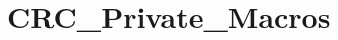 \hypertarget{group___c_r_c___private___macros}{}\section{C\+R\+C\+\_\+\+Private\+\_\+\+Macros}
\label{group___c_r_c___private___macros}
